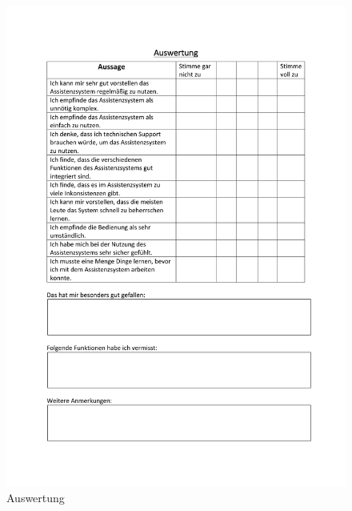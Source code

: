 \begin{figure}[htbp]
\centering
\includegraphics[scale=0.8]{DA_files/Bilder/Anhang/Fragebogen-Auswertung.pdf}
\caption{Auswertung}
\end{figure}


